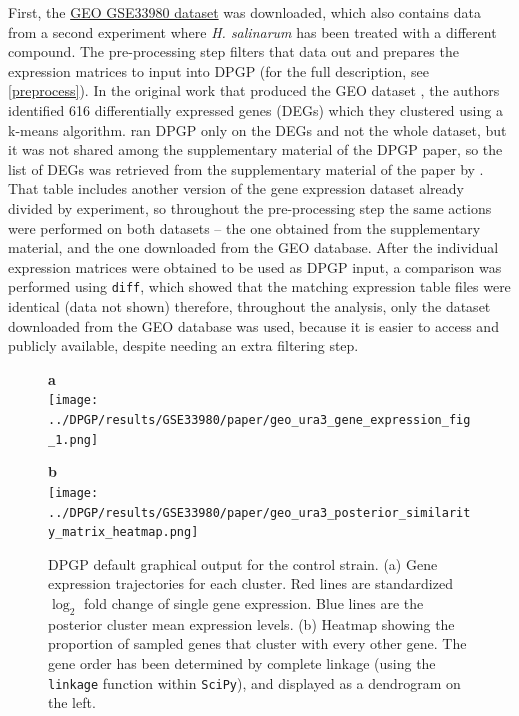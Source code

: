 First, the \href{https://www.ncbi.nlm.nih.gov/geo/query/acc.cgi?acc=GSE33980}{GEO GSE33980 dataset} was downloaded, which also contains data from a second experiment where \textit{H. salinarum} has been treated with a different compound. The pre-processing step filters that data out and prepares the expression matrices to input into DPGP (for the full description, see \ref{preprocess}). In the original work that produced the GEO dataset \citep{sharmaRosRTranscriptionFactor2012}, the authors identified 616 differentially expressed genes (DEGs) which they clustered using a k-means algorithm. \citeauthor{mcdowellClusteringGeneExpression2018} ran DPGP only on the DEGs and not the whole dataset, but it was not shared among the supplementary material of the DPGP paper, so the list of DEGs was retrieved from the supplementary material of the paper by \citeauthor{sharmaRosRTranscriptionFactor2012}. That table includes another version of the gene expression dataset already divided by experiment, so throughout the pre-processing step the same actions were performed on both datasets --  the one obtained from the supplementary material, and the one downloaded from the GEO database. After the individual expression matrices were obtained to be used as DPGP input, a comparison was performed using \texttt{diff}, which showed that the matching expression table files were identical (data not shown) therefore, throughout the analysis, only the dataset downloaded from the GEO database was used, because it is easier to access and publicly available, despite needing an extra filtering step.

\begin{figure}[!ht]
    \centering
    \parbox{.5\textwidth}{
        \textbf{a}\\
        \texttt{[image: ../DPGP/results/GSE33980/paper/geo\_ura3\_gene\_expression\_fig\_1.png]}
    }
    \parbox{.45\textwidth}{
        \textbf{b}\\
        \texttt{[image: ../DPGP/results/GSE33980/paper/geo\_ura3\_posterior\_similarity\_matrix\_heatmap.png]}
    }
    \caption[DPGP default output for the control strain]{DPGP default graphical output for the control strain. (a) Gene expression trajectories for each cluster. Red lines are standardized $\log_{2}$ fold change of single gene expression. Blue lines are the posterior cluster mean expression levels. (b) Heatmap showing the proportion of sampled genes that cluster with every other gene. The gene order has been determined by complete linkage (using the \texttt{linkage} function within \texttt{SciPy}), and displayed as a dendrogram on the left.}\label{img:dpgp_ctrl}
\end{figure}

